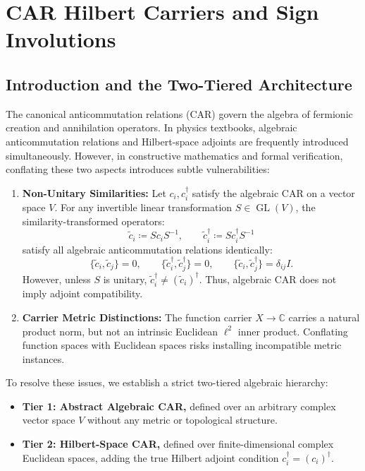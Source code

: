 \chapter{CAR Hilbert Carriers and Sign Involutions}
\label{app:car_hilbert}

\section{Introduction and the Two-Tiered Architecture}

The canonical anticommutation relations (CAR) govern the algebra of fermionic creation and annihilation operators. In physics textbooks, algebraic anticommutation relations and Hilbert-space adjoints are frequently introduced simultaneously. However, in constructive mathematics and formal verification, conflating these two aspects introduces subtle vulnerabilities:
\begin{enumerate}
    \item \textbf{Non-Unitary Similarities:} Let $c_i, c_i^\dagger$ satisfy the algebraic CAR on a vector space $V$. For any invertible linear transformation $S \in \operatorname{GL}(V)$, the similarity-transformed operators:
    \begin{equation}
    \tilde{c}_i \coloneqq S c_i S^{-1}, \qquad \tilde{c}_i^\dagger \coloneqq S c_i^\dagger S^{-1}
    \end{equation}
    satisfy all algebraic anticommutation relations identically:
    \[
    \{\tilde{c}_i, \tilde{c}_j\} = 0, \qquad \{\tilde{c}_i^\dagger, \tilde{c}_j^\dagger\} = 0, \qquad \{\tilde{c}_i, \tilde{c}_j^\dagger\} = \delta_{ij} I.
    \]
    However, unless $S$ is unitary, $\tilde{c}_i^\dagger \neq (\tilde{c}_i)^\dagger$. Thus, algebraic CAR does not imply adjoint compatibility.
    \item \textbf{Carrier Metric Distinctions:} The function carrier $X \to \mathbb{C}$ carries a natural product norm, but not an intrinsic Euclidean $\ell^2$ inner product. Conflating function spaces with Euclidean spaces risks installing incompatible metric instances.
\end{enumerate}

To resolve these issues, we establish a strict two-tiered algebraic hierarchy:
\begin{itemize}
    \item \textbf{Tier 1: Abstract Algebraic CAR,} defined over an arbitrary complex vector space $V$ without any metric or topological structure.
    \item \textbf{Tier 2: Hilbert-Space CAR,} defined over finite-dimensional complex Euclidean spaces, adding the true Hilbert adjoint condition $c_i^\dagger = (c_i)^\dagger$.
\end{itemize}

